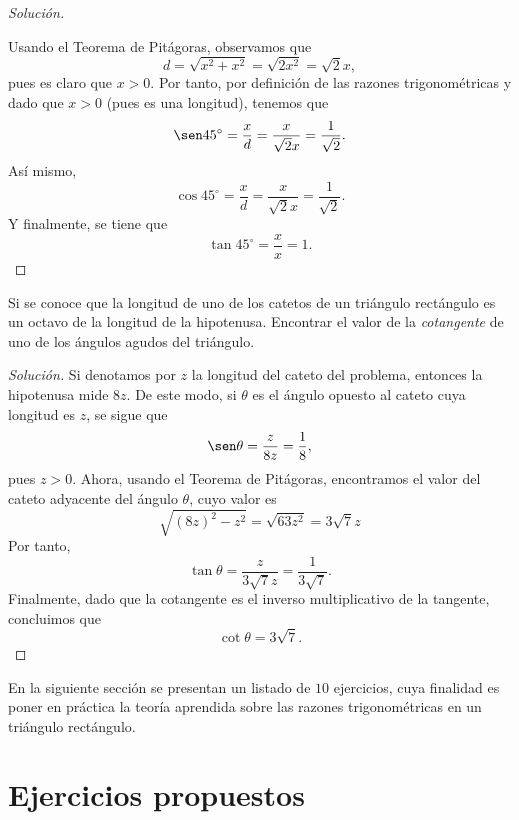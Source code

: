 \documentclass[12pt]{article}
\begin{document}
\begin{exer}
\begin{proof}[Soluci\'on]
\begin{center}
\begin{tikzpicture}
\end{tikzpicture}
\end{center}
Usando el Teorema de Pit\'agoras, observamos que 
\[
d=\sqrt{x^2 + x^2} = \sqrt{2x^2} = \sqrt{2} x,
\]
pues es claro que $x>0$. Por tanto, por definici\'on de las razones trigonom\'etricas y dado que $x>0$ (pues es una longitud), tenemos que 
\[
\sen 45^\circ = \frac{x}{d} = \frac{x}{\sqrt{2}x} = \frac{1}{\sqrt{2}}.
\]
As\'i mismo, 
\[
\cos 45^\circ = \frac{x}{d} = \frac{x}{\sqrt{2}x} = \frac{1}{\sqrt{2}}.
\]
Y finalmente, se tiene que 
\[
\tan 45^\circ = \frac{x}{x} = 1.
\]
    
\end{proof}

    
\end{exer}
\begin{exer}    Si se conoce que la longitud de uno de los catetos de un  tri\'angulo rect\'angulo es un octavo de la longitud de la hipotenusa. Encontrar el valor de la \textit{cotangente} de uno de los \'angulos agudos del tri\'angulo.
    \begin{proof}[Soluci\'on] Si denotamos por $z$ la longitud del cateto del problema, entonces la hipotenusa mide $8z$. De este modo, si $\theta$ es el \'angulo opuesto al cateto cuya longitud es $z$, se sigue que 
    \[
    \sen \theta = \frac{z}{8z} = \frac{1}{8},
    \]
    pues $z>0$.
    Ahora, usando el Teorema de Pit\'agoras, encontramos el valor del cateto adyacente del \'angulo $\theta$, cuyo valor es 
    \[
    \sqrt{(8z)^2 - z^2} = \sqrt{63z^2} = 3 \sqrt{7}z
    \]
    Por tanto, 
    \[
    \tan \theta = \frac{z}{3 \sqrt{7}z} = \frac{1}{3 \sqrt{7}}.
    \]
    Finalmente, dado que la cotangente es el inverso multiplicativo de la tangente, concluimos que 
    \[
    \cot \theta = 3 \sqrt{7}.
    \]
        
    \end{proof}
\end{exer}
En la siguiente secci\'on se presentan un listado de $10$ ejercicios, cuya finalidad es poner en pr\'actica la teor\'ia aprendida sobre las razones trigonom\'etricas en un tri\'angulo rect\'angulo. 
\section{Ejercicios propuestos}
\end{document}
